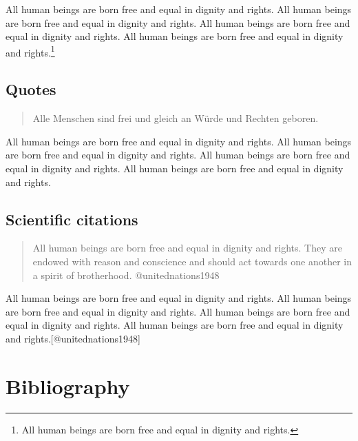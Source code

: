 \documentclass[
  ngerman,
  american,
  ]{scrartcl}
\begin{document}
All human beings are born free and equal in dignity and rights. All
human beings are born free and equal in dignity and rights. All human
beings are born free and equal in dignity and rights. All human beings
are born free and equal in dignity and rights.\footnote{All human beings
  are born free and equal in dignity and rights.}

\subsection{Quotes}\label{quotes}

\begin{otherlanguage}{ngerman}

\begin{quote}
Alle Menschen sind frei und gleich an Würde und Rechten geboren.
\end{quote}

\end{otherlanguage}

All human beings are born free and equal in dignity and rights. All
human beings are born free and equal in dignity and rights. All human
beings are born free and equal in dignity and rights. All human beings
are born free and equal in dignity and rights.

\subsection{Scientific citations}\label{scientific-citations}

\begin{quote}
All human beings are born free and equal in dignity and rights. They are
endowed with reason and conscience and should act towards one another in
a spirit of brotherhood. @unitednations1948
\end{quote}

All human beings are born free and equal in dignity and rights. All
human beings are born free and equal in dignity and rights. All human
beings are born free and equal in dignity and rights. All human beings
are born free and equal in dignity and rights.{[}@unitednations1948{]}

\section{Bibliography}\label{bibliography}

\protect{}\label{refs}
\end{document}
